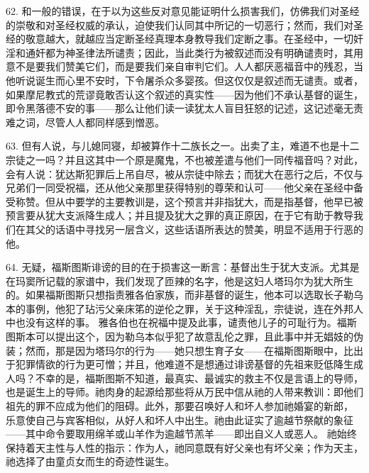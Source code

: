 62. 和一般的错误，在于以为这些反对意见能证明什么损害我们，仿佛我们对圣经的崇敬和对圣经权威的承认，迫使我们认同其中所记的一切恶行；然而，我们对圣经的敬意越大，就越应当定断圣经真理本身教导我们定断之事。在圣经中，一切奸淫和通奸都为神圣律法所谴责；因此，当此类行为被叙述而没有明确谴责时，其用意不是要我们赞美它们，而是要我们亲自审判它们。人人都厌恶福音中的残忍，当他听说诞生而心里不安时，下令屠杀众多婴孩。但这仅仅是叙述而无谴责。或者，如果摩尼教式的荒谬竟敢否认这个叙述的真实性——因为他们不承认基督的诞生，即令黑落德不安的事——那么让他们读一读犹太人盲目狂怒的记述，这记述毫无责难之词，尽管人人都同样感到憎恶。\par

63. 但有人说，与儿媳同寝，却被算作十二族长之一。出卖了主，难道不也是十二宗徒之一吗？并且这其中一个原是魔鬼，不也被差遣与他们一同传福音吗？对此，会有人说：犹达斯犯罪后上吊自尽，被从宗徒中除去；而犹大在恶行之后，不仅与兄弟们一同受祝福，还从他父亲那里获得特别的尊荣和认可——他父亲在圣经中备受称赞。但从中要学的主要教训是，这个预言并非指犹大，而是指基督，他早已被预言要从犹大支派降生成人；并且提及犹大之罪的真正原因，在于它有助于教导我们在其父的话语中寻找另一层含义，这些话语所表达的赞美，明显不适用于行恶的他。\par

64. 无疑，福斯图斯诽谤的目的在于损害这一断言：基督出生于犹大支派。尤其是在玛窦所记载的家谱中，我们发现了匝辣的名字，他是这妇人塔玛尔为犹大所生的。如果福斯图斯只想指责雅各伯家族，而非基督的诞生，他本可以选取长子勒乌本的事例，他犯了玷污父亲床笫的逆伦之罪，关于这种淫乱，宗徒说，连在外邦人中也没有这样的事。 雅各伯也在祝福中提及此事，谴责他儿子的可耻行为。福斯图斯本可以提出这个，因为勒乌本似乎犯了故意乱伦之罪，且此事中并无娼妓的伪装；然而，那是因为塔玛尔的行为——她只想生育子女——在福斯图斯眼中，比出于犯罪情欲的行为更可憎；并且，他难道不是想通过诽谤基督的先祖来贬低降生成人吗？不幸的是，福斯图斯不知道，最真实、最诚实的救主不仅是言语上的导师，也是诞生上的导师。祂肉身的起源给那些将从万民中信从祂的人带来教训：即他们祖先的罪不应成为他们的阻碍。此外，那要召唤好人和坏人参加祂婚宴的新郎， 乐意使自己与宾客相似，从好人和坏人中出生。祂由此证实了逾越节祭献的象征——其中命令要取用绵羊或山羊作为逾越节羔羊——即出自义人或恶人。 祂始终保持着天主性与人性的指示：作为人，祂同意既有好父亲也有坏父亲；作为天主，祂选择了由童贞女而生的奇迹性诞生。\par

